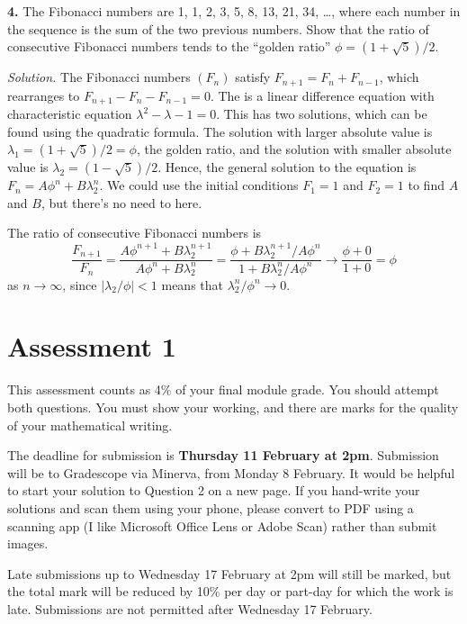 \documentclass[
  a4paper,
]{article}
\theoremstyle{definition}
\theoremstyle{definition}
\theoremstyle{definition}
\theoremstyle{remark}
\begin{document}
\textbf{4.} The Fibonacci numbers are 1, 1, 2, 3, 5, 8, 13, 21, 34, \ldots, where each number in the sequence is the sum of the two previous numbers. Show that the ratio of consecutive Fibonacci numbers tends to the ``golden ratio'' \(\phi = (1 + \sqrt{5})/2\).

\begin{myanswers}

\emph{Solution.} The Fibonacci numbers \((F_n)\) satisfy \(F_{n+1} = F_n + F_{n-1}\), which rearranges to \(F_{n+1} -F_n - F_{n-1} = 0\). The is a linear difference equation with characteristic equation \(\lambda^2 - \lambda - 1 = 0\). This has two solutions, which can be found using the quadratic formula. The solution with larger absolute value is \(\lambda_1 = (1+\sqrt{5})/2 = \phi\), the golden ratio, and the solution with smaller absolute value is \(\lambda_2 = (1-\sqrt{5})/2\). Hence, the general solution to the equation is \(F_n = A\phi^n + B\lambda_2^n\). We could use the initial conditions \(F_1 = 1\) and \(F_2 = 1\) to find \(A\) and \(B\), but there's no need to here.

The ratio of consecutive Fibonacci numbers is
\[ \frac{F_{n+1}}{F_n} = \frac{A\phi^{n+1} + B\lambda_2^{n+1}}{A\phi^n + B\lambda_2^n} = \frac{\phi + B\lambda_2^{n+1}/A\phi^n}{1 + B\lambda_2^n/A\phi^n} \to \frac{\phi + 0}{1 + 0} = \phi \]
as \(n \to \infty\), since \(|\lambda_2/\phi| < 1\) means that \(\lambda_2^n / \phi^n \to 0\).

\end{myanswers}

\hypertarget{A1}{%
\section*{Assessment 1}\label{A1}}

This assessment counts as 4\% of your final module grade. You should attempt both questions. You must show your working, and there are marks for the quality of your mathematical writing.

The deadline for submission is \textbf{Thursday 11 February at 2pm}. Submission will be to Gradescope via Minerva, from Monday 8 February. It would be helpful to start your solution to Question 2 on a new page. If you hand-write your solutions and scan them using your phone, please convert to PDF using a scanning app (I like Microsoft Office Lens or Adobe Scan) rather than submit images.

Late submissions up to Wednesday 17 February at 2pm will still be marked, but the total mark will be reduced by 10\% per day or part-day for which the work is late. Submissions are not permitted after Wednesday 17 February.
\end{document}
